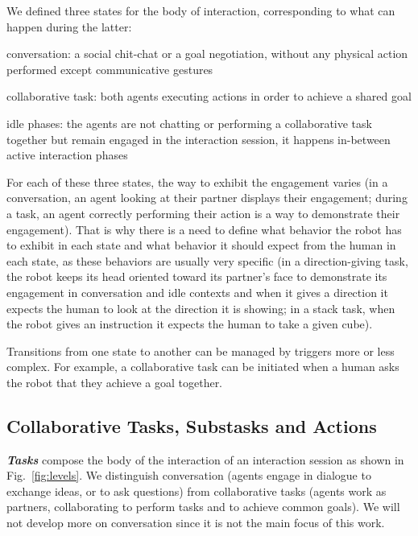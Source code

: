 \documentclass[a4paper,11pt,twoside]{StyleThese}
\begin{document}
We defined three states for the body of interaction, corresponding to what can happen during the latter: 
\begin{bulletList}
	\item conversation: a social chit-chat or a goal negotiation, without any physical action performed except communicative gestures
	\item collaborative task: both agents executing actions in order to achieve a shared goal
	\item idle phases: the agents are not chatting or performing a collaborative task together but remain engaged in the interaction session, it happens in-between active interaction phases
\end{bulletList}

For each of these three states, the way to exhibit the engagement varies (\eg in a conversation, an agent looking at their partner displays their engagement; during a task, an agent correctly performing their action is a way to demonstrate their engagement). That is why there is a need to define what behavior the robot has to exhibit in each state and what behavior it should expect from the human in each state, as these behaviors are usually very specific (\eg in a direction-giving task, the robot keeps its head oriented toward its partner's face to demonstrate its engagement in conversation and idle contexts and when it gives a direction it expects the human to look at the direction it is showing; in a stack task, when the robot gives an instruction it expects the human to take a given cube).

Transitions from one state to another can be managed by triggers more or less complex. For example, a collaborative task can be initiated when a human asks the robot that they achieve a goal together.


\subsection{Collaborative Tasks, Substasks and Actions}
\textbf{\textit{Tasks}} compose the body of the interaction of an interaction session as shown in Fig.~\ref{fig:levels}. We distinguish conversation (\ie agents engage in dialogue to exchange ideas, or to ask questions) from collaborative tasks (\ie agents work as partners, collaborating to perform tasks and to achieve common goals). We will not develop more on conversation since it is not the main focus of this work.
\end{document}
